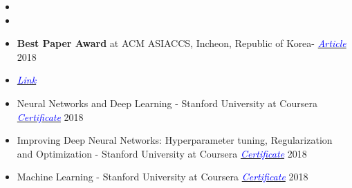 
\begin{itemize}[noitemsep,topsep=0pt]
	\item {}
	\item {}
	\item \textbf{Best Paper Award} at ACM ASIACCS, Incheon, Republic of Korea- \href{https://www.bu.edu/eng/2018/08/14/best-paper-award-asia-conference-on-computer-and-communication-security-2018/}{\textit{\textcolor{blue}{Article}}} 2018
	\item {} \href{https://hdl.handle.net/2144/27051}{\textit{\textcolor{blue}{Link}}}
	\item Neural Networks and Deep Learning - Stanford University at Coursera \href{https://www.coursera.org/account/accomplishments/certificate/ZU26W977NR9P}{\textit{\textcolor{blue}{Certificate}}} 2018
	\item Improving Deep Neural Networks: Hyperparameter tuning, Regularization and Optimization - Stanford University at Coursera \href{https://www.coursera.org/account/accomplishments/certificate/U5YHWN3XSAQU}{\textit{\textcolor{blue}{Certificate}}} 2018
	\item Machine Learning - Stanford University at Coursera  \href{https://www.coursera.org/account/accomplishments/verify/U5YHWN3XSAQU}{\textit{\textcolor{blue}{Certificate}}} 2018
\end{itemize}